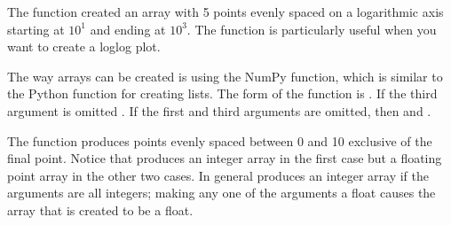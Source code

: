 \documentclass[letterpaper,10pt,english]{sphinxmanual}
\begin{document}
\sphinxAtStartPar
The  function created an array with 5 points evenly spaced on a logarithmic axis starting at \(10^1\) and ending at  \(10^3\).  The  function is particularly useful when you want to create a log\sphinxhyphen{}log plot.

\sphinxAtStartPar
The  way arrays can be created is using the NumPy  function, which is similar to the Python  function for creating lists.  The form of the function is .  If the third argument is omitted .  If the first and third arguments are omitted, then  and .

\begin{sphinxVerbatim}[commandchars=\\\{\},numbers=left,firstnumber=1,stepnumber=1]
  
\PYG{p}{[}    \PYG{p}{]}

  
\PYG{p}{[}     \PYG{p}{]}

  
\PYG{p}{[}           \PYG{p}{]}
\end{sphinxVerbatim}

\sphinxAtStartPar
The  function produces points evenly spaced between 0 and 10 exclusive of the final point.  Notice that  produces an integer array in the first case but a floating point array in the other two cases.  In general  produces an integer array if the arguments are all integers; making any one of the arguments a float causes the array that is created to be a float.
\end{document}
